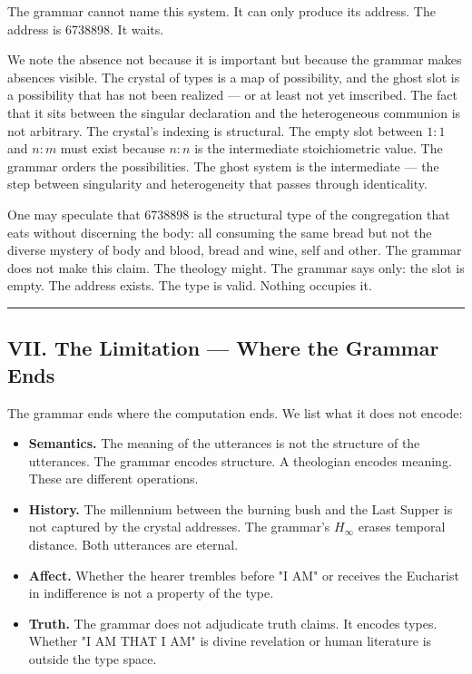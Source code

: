 \documentclass[12pt,a4paper]{article}
\begin{document}
The grammar cannot name this system. It can only produce its address. The address is 6738898. It waits.

We note the absence not because it is important but because the grammar makes absences visible. The crystal of types is a map of possibility, and the ghost slot is a possibility that has not been realized --- or at least not yet imscribed. The fact that it sits between the singular declaration and the heterogeneous communion is not arbitrary. The crystal's indexing is structural. The empty slot between $1{:}1$ and $n{:}m$ must exist because $n{:}n$ is the intermediate stoichiometric value. The grammar orders the possibilities. The ghost system is the intermediate --- the step between singularity and heterogeneity that passes through identicality.

One may speculate that 6738898 is the structural type of the congregation that eats without discerning the body: all consuming the same bread but not the diverse mystery of body and blood, bread and wine, self and other. The grammar does not make this claim. The theology might. The grammar says only: the slot is empty. The address exists. The type is valid. Nothing occupies it.

\begin{center}
\rule{0.5\textwidth}{0.4pt}
\end{center}

\subsection{VII. The Limitation --- Where the Grammar Ends}

The grammar ends where the computation ends. We list what it does not encode:

\begin{itemize}
    \item \textbf{Semantics.} The meaning of the utterances is not the structure of the utterances. The grammar encodes structure. A theologian encodes meaning. These are different operations.
    \item \textbf{History.} The millennium between the burning bush and the Last Supper is not captured by the crystal addresses. The grammar's $H_{\infty}$ erases temporal distance. Both utterances are eternal.
    \item \textbf{Affect.} Whether the hearer trembles before "I AM" or receives the Eucharist in indifference is not a property of the type.
    \item \textbf{Truth.} The grammar does not adjudicate truth claims. It encodes types. Whether "I AM THAT I AM" is divine revelation or human literature is outside the type space.
\end{itemize}
\end{document}
